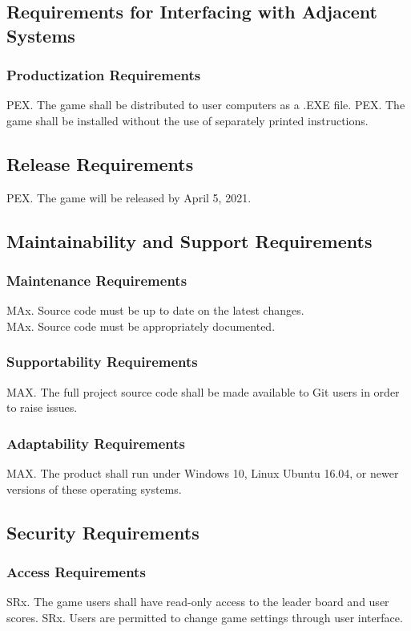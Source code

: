 \documentclass[12pt]{article}
\begin{document}
\subsection{Requirements for Interfacing with Adjacent Systems}
    \subsubsection{Productization Requirements}
    PEX. The game shall be distributed to user computers as a .EXE file.
    PEX. The game shall be installed without the use of separately printed instructions.
    
 \subsection{Release Requirements}
    PEX. The game will be released by April 5, 2021.
    
 \subsection{Maintainability and Support Requirements}
    \subsubsection{Maintenance Requirements}
     MAx. Source code must be up to date on the latest changes.\\
    MAx. Source code must be appropriately documented.
    
    \subsubsection{Supportability Requirements}
    MAX. The full project source code shall be made available to Git users in order to raise issues.
    
    \subsubsection{Adaptability Requirements}
    MAX. The product shall run under Windows 10, Linux Ubuntu 16.04, or newer versions of these operating systems.
    
\subsection{Security Requirements}
    \subsubsection{Access Requirements}
    SRx. The game users shall have read-only access to the leader board and user scores.
    SRx. Users are permitted to change game settings through user interface.
    
\end{document}
